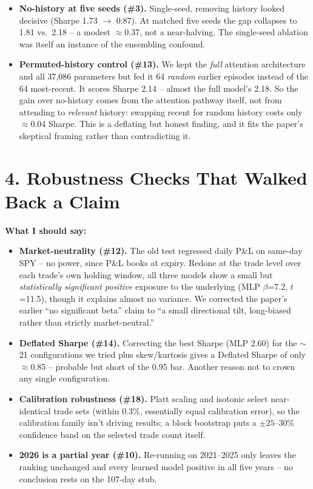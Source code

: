 \documentclass[11pt]{article}
\begin{document}
\begin{itemize}
\item \textbf{No-history at five seeds (\#3).} Single-seed, removing history looked decisive (Sharpe 1.73 $\to$ 0.87). At matched five seeds the gap collapses to 1.81 vs.\ 2.18 -- a modest $\approx$0.37, not a near-halving. The single-seed ablation was itself an instance of the ensembling confound.
\item \textbf{Permuted-history control (\#13).} We kept the \emph{full} attention architecture and all 37,086 parameters but fed it 64 \emph{random} earlier episodes instead of the 64 most-recent. It scores Sharpe 2.14 -- almost the full model's 2.18. So the gain over no-history comes from the attention pathway itself, not from attending to \emph{relevant} history: swapping recent for random history costs only $\approx$0.04 Sharpe. This is a deflating but honest finding, and it fits the paper's skeptical framing rather than contradicting it.
\end{itemize}

\section*{4. Robustness Checks That Walked Back a Claim}
\textbf{What I should say:}

\begin{itemize}
\item \textbf{Market-neutrality (\#12).} The old test regressed daily P\&L on same-day SPY -- no power, since P\&L books at expiry. Redone at the trade level over each trade's own holding window, all three models show a small but \emph{statistically significant positive} exposure to the underlying (MLP $\beta$=7.2, $t$=11.5), though it explains almost no variance. We corrected the paper's earlier ``no significant beta'' claim to ``a small directional tilt, long-biased rather than strictly market-neutral.''
\item \textbf{Deflated Sharpe (\#14).} Correcting the best Sharpe (MLP 2.60) for the $\sim$21 configurations we tried plus skew/kurtosis gives a Deflated Sharpe of only $\approx$0.85 -- probable but short of the 0.95 bar. Another reason not to crown any single configuration.
\item \textbf{Calibration robustness (\#18).} Platt scaling and isotonic select near-identical trade sets (within 0.3\%, essentially equal calibration error), so the calibration family isn't driving results; a block bootstrap puts a $\pm25$--$30\%$ confidence band on the selected trade count itself.
\item \textbf{2026 is a partial year (\#10).} Re-running on 2021--2025 only leaves the ranking unchanged and every learned model positive in all five years -- no conclusion rests on the 107-day stub.
\end{itemize}
\end{document}
